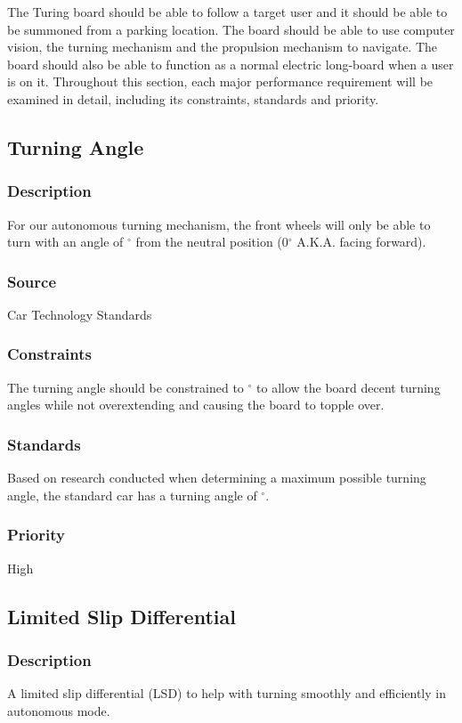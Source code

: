 The Turing board should be able to follow a target user and it should be able to be summoned from a parking location. The board should be able to use computer vision, the turning mechanism and the propulsion mechanism to navigate. The board should also be able to function as a normal electric long-board when a user is on it. Throughout this section, each major performance requirement will be examined in detail, including its constraints, standards and priority.

\subsection{Turning Angle}
\subsubsection{Description}
For our autonomous turning mechanism, the front wheels will only be able to turn with an angle of $^{\circ}$ from the neutral position (0$^{\circ}$ A.K.A. facing forward).
\subsubsection{Source}
Car Technology Standards
\subsubsection{Constraints}
The turning angle should be constrained to $^{\circ}$ to allow the board decent turning angles while not overextending and causing the board to topple over.
\subsubsection{Standards}
Based on research conducted when determining a maximum possible turning angle, the standard car has a turning angle of $^{\circ}$.
\subsubsection{Priority}
High

\subsection{Limited Slip Differential}
\subsubsection{Description}
A limited slip differential (LSD) to help with turning smoothly and efficiently in autonomous mode.
